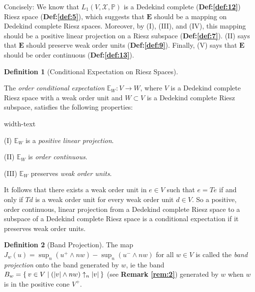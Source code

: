 \documentclass[letterpaper,10pt,oneside,onecolumn,reqno]{amsart}
\newcommand{\E}{\mathbb E}
\renewcommand{\P}{\mathbb P}
\newcommand{\X}{\mathcal X}
\theoremstyle{definition}
\newtheorem{defn}{Definition}
\newcommand{\meet}{\wedge}
\begin{document}
\begin{framed}
  Concisely: We know that $L_1(V,\X,\P)$ is a Dedekind complete
  (\textbf{Def:\ref{def:12}}) Riesz space (\textbf{Def:\ref{def:5}}),
  which suggests that $\mathbf{E}$ should be a mapping on Dedekind
  complete Riesz spaces. Moreover, by (I), (III), and (IV), this
  mapping should be a positive
  linear projection on a Riesz subspace
  (\textbf{Def:\ref{def:7}}). (II) says that $\mathbf{E}$ should
  preserve weak order units (\textbf{Def:\ref{def:9}}). Finally, (V)
  says that $\mathbf{E}$ should be order continuous
  (\textbf{Def:\ref{def:13}}).
\end{framed}

\begin{defn}[Conditional Expectation on Riesz Spaces]\label{def:15}

  The \emph{order conditional
    expectation} $\E_W: V \to W$, where $V$ is a Dedekind complete
  Riesz space with a weak order unit and $W \subset V$ is a Dedekind
  complete Riesz subspace, satisfies the following properties:

  \begin{deflist}{width-text}
  \item[(I)] $\E_W$ is a \emph{positive linear projection}.
  \item[(II)] $\E_W$ is \emph{order continuous}.
  \item[(III)] $\E_W$ preserves \emph{weak order units}.
  \end{deflist}
\end{defn}

\begin{framed}
  It follows that there exists a weak order unit in $e \in V$ such
  that $e = Te$ if and only if $Td$ is a weak order unit for every
  weak order unit $d \in V$. So a positive, order continuous, linear
  projection from a Dedekind complete Riesz space to a subspace of a
  Dedekind complete Riesz space is a conditional expectation if it
  preserves weak order units. 
\end{framed}

\begin{defn}[Band Projection]\label{def:16}
  The map $J_w(u) = \sup_n (u^+ \meet nw) - \sup_n(u^- \meet nw)$ for
  all $w \in V$ is called the \emph{band
    projection} onto the band generated by $w$, ie the band $B_w =
  \Set{v \in V | (|v| \meet nw) \uparrow_n |v|}$ (see \textbf{Remark
    \ref{rem:2}}) generated by $w$ when $w$ is in the positive cone
  $V^+$.
\end{defn}
\end{document}
